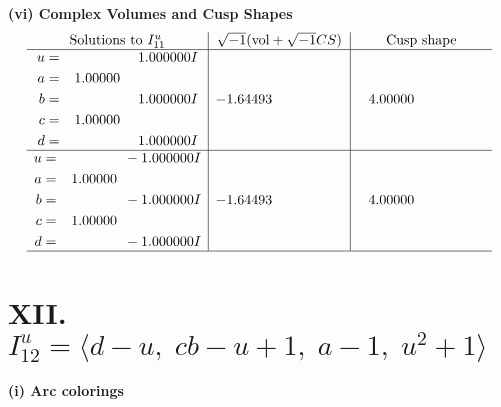 \documentclass[1p]{elsarticle_modified}
\theoremstyle{definition}
\newcommand{\I}{\sqrt{-1}}
\begin{document}
\newpage\flushleft \textbf{(vi) Complex Volumes and Cusp Shapes}
$$\begin{array}{c|c|c}  
\text{Solutions to }I^u_{11}& \I (\text{vol} + \sqrt{-1}CS) & \text{Cusp shape}\\
 \hline 
\begin{aligned}
u &= \phantom{-0.000000 -}1.000000 I \\
a &= \phantom{-}1.00000\phantom{ +0.000000I} \\
b &= \phantom{-0.000000 -}1.000000 I \\
c &= \phantom{-}1.00000\phantom{ +0.000000I} \\
d &= \phantom{-0.000000 -}1.000000 I\end{aligned}
 & -1.64493\phantom{ +0.000000I} & \phantom{-}4.00000\phantom{ +0.000000I} \\ \hline\begin{aligned}
u &= \phantom{-0.000000 } -1.000000 I \\
a &= \phantom{-}1.00000\phantom{ +0.000000I} \\
b &= \phantom{-0.000000 } -1.000000 I \\
c &= \phantom{-}1.00000\phantom{ +0.000000I} \\
d &= \phantom{-0.000000 } -1.000000 I\end{aligned}
 & -1.64493\phantom{ +0.000000I} & \phantom{-}4.00000\phantom{ +0.000000I}\\
 \hline 
 \end{array}$$\newpage\newpage\renewcommand{\arraystretch}{1}
\centering \section*{XII. $I^u_{12}= \langle d- u,\;c b- u+1,\;a-1,\;u^2+1 \rangle$}
\flushleft \textbf{(i) Arc colorings}\\
\end{document}
